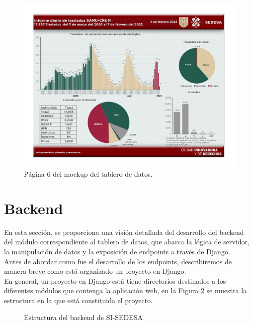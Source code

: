 \begin{figure}[H]
        \centering
        \includegraphics[width=\textwidth]{images/mockup_6.jpg}
        \caption{Página 6 del mockup del tablero de datos.} \label{fig:mock_pag6}
\end{figure}


\section{Backend}\label{sec:backend}

En esta sección, se proporciona una visión detallada del desarrollo del backend del módulo correspondiente al tablero de datos, que abarca la lógica de servidor, la manipulación de datos y la exposición de endpoints a través de Django.\\

Antes de abordar como fue el desarrollo de los endpoints, describiremos de manera breve como está organizado un proyecto en Django.\\

En general, un proyecto en Django está tiene directorios destinados a los diferentes módulos que contenga la aplicación web, en la Figura \ref{fig:backend-estructura} se muestra la estructura en la que está constituida el proyecto.

\begin{figure}
    \caption{Estructura del backend de SI-SEDESA}
    \label{fig:backend-estructura}
\end{figure}

